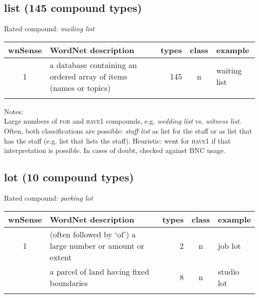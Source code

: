 \subsection{list      (145 compound types)}
Rated compound: \emph{mailing list}

\vspace*{1ex}

\noindent
\begin{longtable}{c>{\raggedright\arraybackslash}p{5cm}rc>{\raggedright\arraybackslash}p{2cm}}\lsptoprule
{\small wnSense}&WordNet description&types&class&example\\\midrule
1&a database containing an ordered array of items (names or topics)&145&n&waiting list\\\lspbottomrule
\end{longtable}

\noindent
Notes:\\
Large numbers of \textsc{for} and \textsc{have1} compounds, e.g. \emph{wedding list} vs. \emph{witness list}. Often, both classifications are possible: \emph{staff list} as list for the staff or as list that has the staff (e.g. list that lists the staff). Heuristic: went for \textsc{have1} if that interpretation is possible. In cases of doubt, checked against BNC usage.


\subsection{lot       (10 compound types)}
Rated compound: \emph{parking lot}

\vspace*{1ex}

\noindent
\begin{longtable}{c>{\raggedright\arraybackslash}p{5cm}rc>{\raggedright\arraybackslash}p{2cm}}\lsptoprule
{\small wnSense}&WordNet description&types&class&example\\\midrule
1&(often followed by `of') a large number or amount or extent&2&n&job lot\\\tablevspace
2&a parcel of land having fixed boundaries&8&n&studio lot\\\lspbottomrule
\end{longtable}

